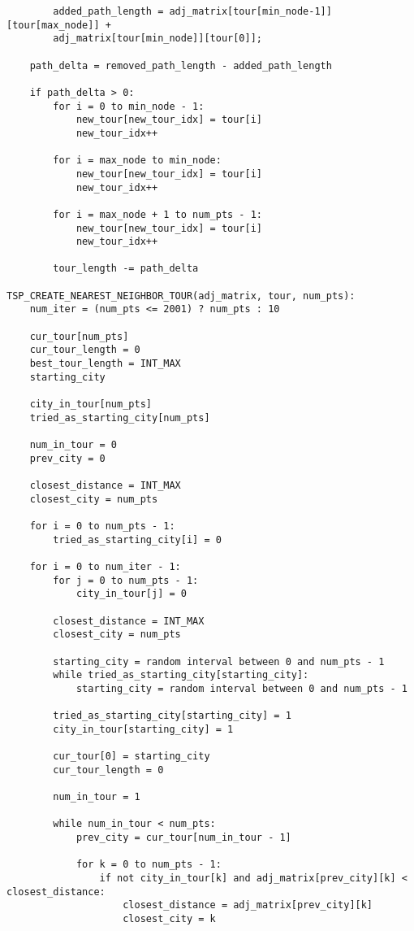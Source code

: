 \documentclass[../report/main.tex]{subfiles}
\begin{document}
\begin{verbatim}
        added_path_length = adj_matrix[tour[min_node-1]][tour[max_node]] + 
        adj_matrix[tour[min_node]][tour[0]];

    path_delta = removed_path_length - added_path_length

    if path_delta > 0:
        for i = 0 to min_node - 1:
            new_tour[new_tour_idx] = tour[i]
            new_tour_idx++

        for i = max_node to min_node:
            new_tour[new_tour_idx] = tour[i]
            new_tour_idx++

        for i = max_node + 1 to num_pts - 1:
            new_tour[new_tour_idx] = tour[i]
            new_tour_idx++

        tour_length -= path_delta

TSP_CREATE_NEAREST_NEIGHBOR_TOUR(adj_matrix, tour, num_pts):
    num_iter = (num_pts <= 2001) ? num_pts : 10

    cur_tour[num_pts]
    cur_tour_length = 0
    best_tour_length = INT_MAX
    starting_city

    city_in_tour[num_pts]
    tried_as_starting_city[num_pts]

    num_in_tour = 0
    prev_city = 0

    closest_distance = INT_MAX
    closest_city = num_pts

    for i = 0 to num_pts - 1:
        tried_as_starting_city[i] = 0

    for i = 0 to num_iter - 1:
        for j = 0 to num_pts - 1:
            city_in_tour[j] = 0

        closest_distance = INT_MAX
        closest_city = num_pts

        starting_city = random interval between 0 and num_pts - 1
        while tried_as_starting_city[starting_city]:
            starting_city = random interval between 0 and num_pts - 1

        tried_as_starting_city[starting_city] = 1
        city_in_tour[starting_city] = 1

        cur_tour[0] = starting_city
        cur_tour_length = 0

        num_in_tour = 1

        while num_in_tour < num_pts:
            prev_city = cur_tour[num_in_tour - 1]

            for k = 0 to num_pts - 1:
                if not city_in_tour[k] and adj_matrix[prev_city][k] < closest_distance:
                    closest_distance = adj_matrix[prev_city][k]
                    closest_city = k


\end{verbatim}
\end{document}
